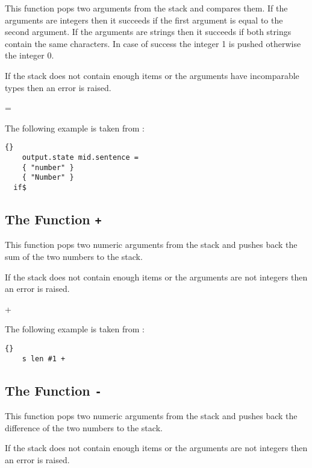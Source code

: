 This function pops two arguments from the stack and compares them.
If the arguments are integers then it succeeds if the first argument is
equal to the second argument. If the arguments are strings then it
succeeds if both strings contain the same characters. In case of
success the integer 1 is pushed otherwise the integer 0.

If the stack does not contain enough items or the arguments have
incomparable types then an error is raised.

\begin{BstFunction}{=}
\end{BstFunction}

The following example is taken from :

\begin{lstlisting}{}
    output.state mid.sentence =
    { "number" }
    { "Number" }
  if$
\end{lstlisting}


\subsection{The Function \texttt{+}}%
\fctIndex{+}

This function pops two numeric arguments from the stack and
pushes back the sum of the two numbers to the stack.

If the stack does not contain enough items or the arguments are not
integers then an error is raised.

\begin{BstFunction}{+}
\end{BstFunction}

The following example is taken from :

\begin{lstlisting}{}
    s len #1 +
\end{lstlisting}


\subsection{The Function \texttt{-}}%
\fctIndex{-}

This function pops two numeric arguments from the stack and
pushes back the difference of the two numbers to the stack.

If the stack does not contain enough items or the arguments are not
integers then an error is raised.

